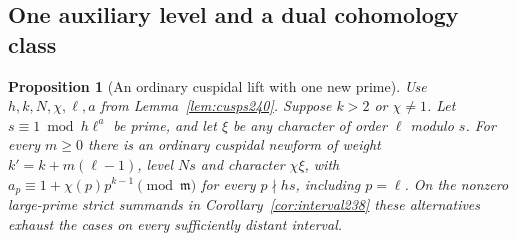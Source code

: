 \documentclass[a4paper,11pt]{article}
\newtheorem{proposition}{Proposition}[section]
\theoremstyle{definition}
\theoremstyle{remark}
\numberwithin{equation}{section}
\begin{document}
\subsection{One auxiliary level and a dual cohomology class}\label{nav:III-37}
\begin{proposition}[An ordinary cuspidal lift with one new prime]
\label{prop:level241}
Use \(h,k,N,\chi,\ell,a\) from Lemma~\ref{lem:cusps240}.
Suppose \(k>2\) or \(\chi\ne1\). Let \(s\equiv1\bmod h\ell^a\)
be prime, and let \(\xi\) be any character of order \(\ell\)
modulo \(s\). For every \(m\ge0\) there is an ordinary
cuspidal newform of weight \(k'=k+m(\ell-1)\), level \(Ns\)
and character \(\chi\xi\), with
\(a_p\equiv1+\chi(p)p^{k-1}\pmod{\mathfrak m}\) for
every \(p\nmid hs\), including \(p=\ell\).
On the nonzero large-prime strict summands in
Corollary~\ref{cor:interval238} these alternatives exhaust
the cases on every sufficiently distant interval.
\end{proposition}
\end{document}
